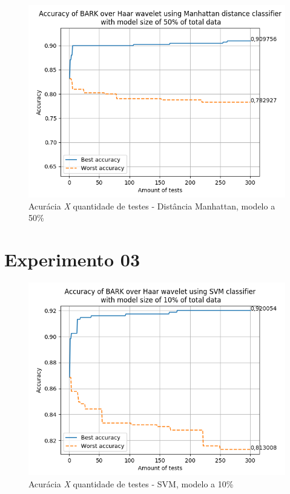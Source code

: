 \begin{myenv}{1.5}
		\newpage
		\begin{figure}[h]
			\centering
			\includegraphics{images/results/confusionMatrices/classifier_Manhattan_50.png}
			\caption{Acurácia \textit{X} quantidade de testes - Distância Manhattan, modelo a 50\%}
			\label{fig:classifiermanhattan50}
		\end{figure}
		

		\section{Experimento 03}

		\newpage
		\begin{figure}[h]
			\centering
			\includegraphics{images/results/confusionMatrices/classifier_SVM_10.png}
			\caption{Acurácia \textit{X} quantidade de testes - SVM, modelo a 10\%}
			\label{fig:classifiersvm10}
		\end{figure}
		


\end{myenv}
